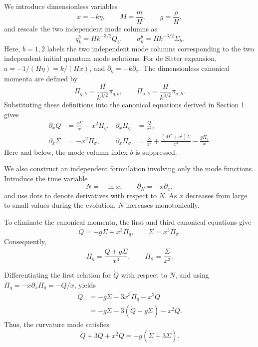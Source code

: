 \documentclass[11pt,a4paper]{article}
\begin{document}
We introduce dimensionless variables
\begin{equation}
x=-k\eta,\qquad M=\frac{m}{H},\qquad g=\frac{\rho}{H},
\end{equation}
and rescale the two independent mode columns as
\begin{equation}
q_k^b=Hk^{-3/2}Q_b,\qquad
\sigma_k^b=Hk^{-3/2}\Sigma_b.
\end{equation}
Here, \(b=1,2\) labels the two independent mode columns corresponding to the two independent initial quantum mode solutions. For de Sitter expansion, $a=-1/(H\eta)=k/(Hx)$, and
$\partial_\eta=-k\partial_x$. The dimensionless canonical
momenta are defined by
\begin{equation}
\Pi_{q,b}=\frac{H}{k^{3/2}}\pi_{q,b},
\qquad
\Pi_{\sigma,b}=\frac{H}{k^{3/2}}\pi_{\sigma,b}.
\end{equation}
Substituting these definitions into the canonical equations
derived in Section 1 gives
\begin{align}
\partial_x Q&=\frac{g\Sigma}{x}-x^2\Pi_q,
&\partial_x\Pi_q&=\frac{Q}{x^2},\\
\partial_x\Sigma&=-x^2\Pi_\sigma,
&\partial_x\Pi_\sigma&=
\frac{\Sigma}{x^2}
+\frac{(M^2+g^2)\Sigma}{x^4}
-\frac{g\Pi_q}{x}.
\end{align}
Here and below, the mode-column index $b$ is suppressed.

We also construct an independent formulation involving only
the mode functions. Introduce the time variable
\begin{equation}
N=-\ln x,\qquad
\partial_N=-x\partial_x,
\end{equation}
and use dots to denote derivatives with respect to $N$.
As $x$ decreases from large to small values during the
evolution, $N$ increases monotonically.

To eliminate the canonical momenta, the first and third
canonical equations give
\begin{equation}
\dot Q=-g\Sigma+x^3\Pi_q,\qquad
\dot\Sigma=x^3\Pi_\sigma.
\end{equation}
Consequently,
\begin{equation}
\Pi_q=\frac{\dot Q+g\Sigma}{x^3},
\qquad
\Pi_\sigma=\frac{\dot\Sigma}{x^3}.
\label{eq:momentum_reconstruction}
\end{equation}

Differentiating the first relation for $\dot Q$ with respect
to $N$, and using $\dot\Pi_q=-x\partial_x\Pi_q=-Q/x$,
yields
\begin{align}
\ddot Q
&=-g\dot\Sigma-3x^3\Pi_q-x^2Q\\
&=-g\dot\Sigma-3(\dot Q+g\Sigma)-x^2Q.
\end{align}
Thus, the curvature mode satisfies
\begin{equation}
\boxed{
\ddot Q+3\dot Q+x^2Q=-g(\dot\Sigma+3\Sigma).
}
\end{equation}
\end{document}
